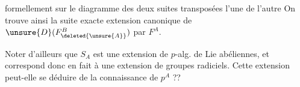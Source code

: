 
formellement sur le diagramme des deux suites transposées l'une de l'autre
On trouve ainsi la suite exacte
extension canonique de $\unsure{D}(F_{\deleted{\unsure{A}}}^{B})$ par $F^A$.

Noter d'ailleurs que $S_A$ est une extension de $p$-alg. de Lie abéliennes, et correspond donc en fait à une extension de groupes radiciels. Cette extension peut-elle se déduire de la connaissance de $p^A$ ??

